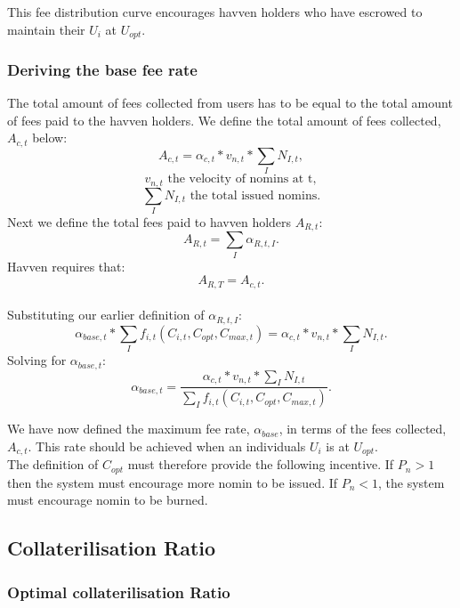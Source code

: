 \noindent This fee distribution curve encourages havven holders who have escrowed to maintain their $U_i$ at $U_{opt}$.  \\

\newpage

\subsubsection{Deriving the base fee rate} The total amount of fees collected from users has to be equal to the total amount of fees paid to the havven holders. We define the total amount of fees collected, $A_{c,t}$ below: \\
$$ A_{c,t}  = \alpha_{c,t} * v_{n,t} * \sum\limits_I N_{I,t}, $$
$$ v_{n,t} \text{ the velocity of nomins at t}, $$
$$  \sum\limits_I N_{I,t} \text{ the total issued nomins}. $$
Next we define the total fees paid to havven holders $A_{R,t}$: \\
$$ A_{R,t} = \sum\limits_I \alpha_{R,t,I}. $$
Havven requires that: \\
$$ A_{R,T} =  A_{c,t}. $$ \\
Substituting our earlier definition of $\alpha_{R,t,I}$: \\
$$ \alpha_{base,t} *\sum\limits_I f_{i,t}(C_{i,t}, C_{opt}, C_{max,t}) =  \alpha_{c,t} * v_{n,t} * \sum\limits_I N_{I,t}. $$
Solving for $\alpha_{base,t}$:\\
$$ \alpha_{base,t} = \frac{\alpha_{c,t} * v_{n,t} * \sum\limits_I N_{I,t}}{\sum\limits_I f_{i,t}(C_{i,t}, C_{opt}, C_{max,t})}.$$

\noindent We have now defined the maximum fee rate, $\alpha_{base}$, in terms of the fees collected, $A_{c,t}$. This rate should be achieved when an individuals $U_i$ is at $U_{opt}$. \\

\noindent The definition of $C_{opt}$ must therefore provide the following incentive. If $P_n > 1$ then the system must encourage more nomin to be issued. If $P_n < 1$, the system must encourage nomin to be burned. 

\newpage

\subsection{Collaterilisation Ratio}
\subsubsection{Optimal collaterilisation Ratio}


